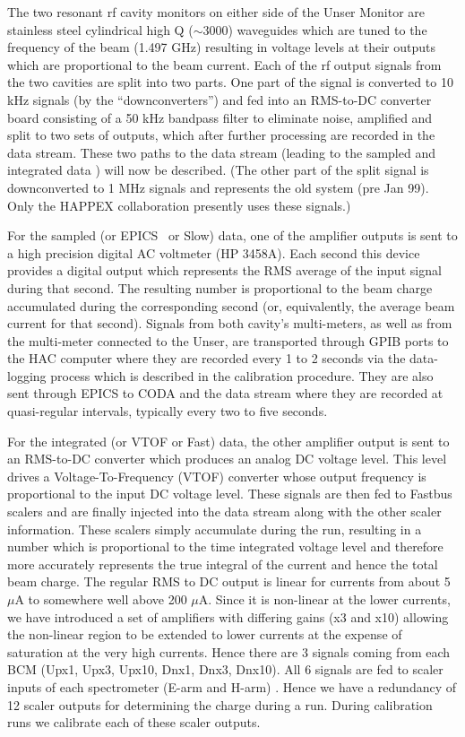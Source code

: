 {{The two resonant rf cavity monitors on either side of the Unser Monitor are 
stainless steel cylindrical high Q ($\sim 3000$) waveguides which are tuned to the 
frequency of the beam (1.497 GHz) resulting in voltage levels at their   outputs 
which are proportional to the beam current. Each of the rf output signals from the 
two cavities are split into two parts. One part of the signal is  converted to 10 
kHz signals (by the ``downconverters'') and fed into an RMS-to-DC converter board 
consisting of a 50 kHz bandpass filter to  eliminate noise, amplified and split to 
two sets of outputs, which after further processing are recorded in the data 
stream. These two paths to the data stream (leading to the sampled and integrated
data ) will now be described. (The other part of the split signal is downconverted 
to 1 MHz signals and represents the old system (pre Jan 99). Only the HAPPEX 
collaboration presently uses these signals.)

For the sampled (or EPICS~\cite{EPICSwww} or Slow) data, one of the amplifier outputs is sent to a 
high precision digital AC voltmeter (HP 3458A). Each second this device provides 
a digital output which represents the  RMS average of the input signal during that 
second.  The resulting number is  proportional to the beam charge accumulated 
during the corresponding second (or, equivalently, the average  beam current  for 
that second). Signals from both cavity's multi-meters, as well as from the 
multi-meter connected to the Unser, are transported through GPIB ports to the HAC 
computer where they are recorded every 1 to 2 seconds via the data-logging process 
which is described in the calibration procedure. They are also sent through EPICS 
to CODA and the data stream where they are recorded at  quasi-regular intervals, 
typically every two to five  seconds.

For the integrated (or VTOF or Fast) data, the other amplifier output is sent to an 
RMS-to-DC converter which   produces  an analog DC  voltage  level. This level 
drives a Voltage-To-Frequency (VTOF) converter whose output frequency is  
proportional to the  input DC voltage level. These signals are then fed to Fastbus  
scalers and are finally injected into the data stream along  with the other scaler 
information.  These scalers simply accumulate during  the run, resulting  in a 
number which is proportional to the time integrated voltage level and therefore 
more accurately represents the true integral of the current and hence the total 
beam charge. The regular RMS to DC output is linear for currents
from about 5 $\mu$A to somewhere well above 200 $\mu$A.
 Since it is non-linear at the lower 
currents, we have introduced a set of amplifiers with differing gains (x3 and x10) 
allowing the non-linear region to be extended to lower currents at the expense of 
saturation at the very high currents. Hence there are 3 signals coming 
from each BCM (Upx1, Upx3, Upx10, Dnx1, Dnx3, Dnx10). All 6 signals are fed 
to scaler inputs of each spectrometer (E-arm and H-arm) . Hence we have a 
redundancy of 12 scaler outputs for determining the charge during a run. During 
calibration runs we calibrate each of these scaler outputs.   
}

}
